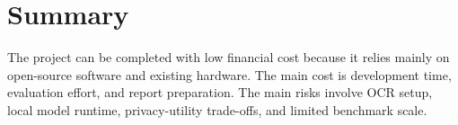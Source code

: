 \section{Summary}

The project can be completed with low financial cost because it relies mainly on open-source software and existing hardware. The main cost is development time, evaluation effort, and report preparation. The main risks involve OCR setup, local model runtime, privacy-utility trade-offs, and limited benchmark scale.
